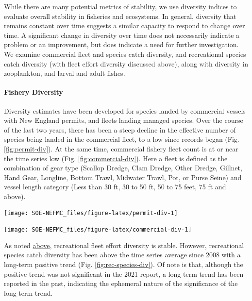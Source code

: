 \documentclass[
  10pt,
]{article}
\let\origfigure\figure
\let\endorigfigure\endfigure
\renewenvironment{figure}[1][2] {
    \expandafter\origfigure\expandafter[H]
} {
    \endorigfigure
}
\begin{document}
While there are many potential metrics of stability, we use diversity indices to evaluate overall stability in fisheries and ecosystems. In general, diversity that remains constant over time suggests a similar capacity to respond to change over time. A significant change in diversity over time does not necessarily indicate a problem or an improvement, but does indicate a need for further investigation. We examine commercial fleet and species catch diversity, and recreational species catch diversity (with fleet effort diversity discussed above), along with diversity in zooplankton, and larval and adult fishes.

\hypertarget{fishery-diversity}{%
\paragraph{Fishery Diversity}\label{fishery-diversity}}

Diversity estimates have been developed for species landed by commercial vessels with New England permits, and fleets landing managed species. Over the course of the last two years, there has been a steep decline in the effective number of species being landed in the commercial fleet, to a low since records began (Fig. \ref{fig:permit-div}). At the same time, commercial fishery fleet count is at or near the time series low (Fig. \ref{fig:commercial-div}). Here a fleet is defined as the combination of gear type (Scallop Dredge, Clam Dredge, Other Dredge, Gillnet, Hand Gear, Longline, Bottom Trawl, Midwater Trawl, Pot, or Purse Seine) and vessel length category (Less than 30 ft, 30 to 50 ft, 50 to 75 feet, 75 ft and above).

\begin{figure}

{\centering \texttt{[image: SOE-NEFMC\_files/figure-latex/permit-div-1]} 

}

\caption{Species revenue diversity in New England.}\label{fig:permit-div}
\end{figure}

\begin{figure}

{\centering \texttt{[image: SOE-NEFMC\_files/figure-latex/commercial-div-1]} 

}

\caption{Commercial fleet count and diversity in New England.}\label{fig:commercial-div}
\end{figure}

As noted \protect\hyperlink{recreational-opportunities}{above}, recreational fleet effort diversity is stable. However, recreational species catch diversity has been above the time series average since 2008 with a long-term positive trend (Fig. \ref{fig:rec-species-div}). Of note is that, although the positive trend was not significant in the 2021 report, a long-term trend has been reported in the past, indicating the ephemeral nature of the significance of the long-term trend.
\end{document}
